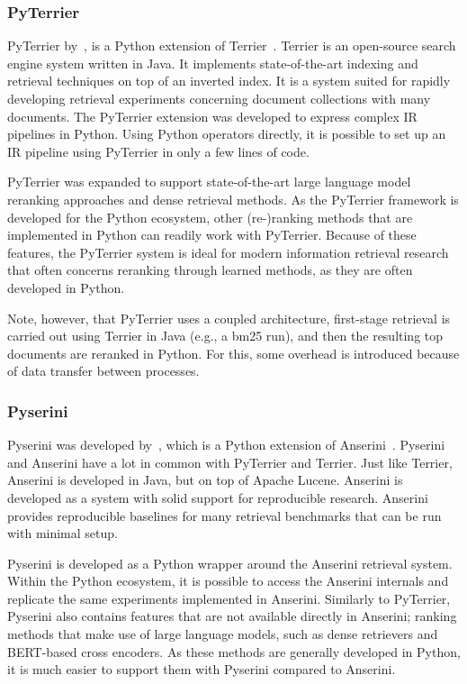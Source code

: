 \subsubsection{PyTerrier}
PyTerrier by~\citet{pyterrier}, is a Python extension of Terrier~\citep{terrier}. Terrier is an open-source search engine system written in Java. It implements state-of-the-art indexing and retrieval techniques on top of an inverted index. It is a system suited for rapidly developing retrieval experiments concerning document collections with many documents. 
The PyTerrier extension was developed to express complex IR pipelines in Python. Using Python operators directly, it is possible to set up an IR pipeline using PyTerrier in only a few lines of code. 

PyTerrier was expanded to support state-of-the-art large language model reranking approaches and dense retrieval methods. As the PyTerrier framework is developed for the Python ecosystem, other (re-)ranking methods that are implemented in Python can readily work with PyTerrier. Because of these features, the PyTerrier system is ideal for modern information retrieval research that often concerns reranking through learned methods, as they are often developed in Python.

Note, however, that PyTerrier uses a coupled architecture, first-stage retrieval is carried out using Terrier in Java (e.g., a bm25 run), and then the resulting top documents are reranked in Python. For this, some overhead is introduced because of data transfer between processes. 

\subsubsection{Pyserini}
Pyserini was developed by~\citet{pyserini}, which is a Python extension of Anserini~\citep{anserini}. Pyserini and Anserini have a lot in common with PyTerrier and Terrier. Just like Terrier, Anserini is developed in Java, but on top of Apache Lucene. Anserini is developed as a system with solid support for reproducible research. Anserini provides reproducible baselines for many retrieval benchmarks that can be run with minimal setup. 

Pyserini is developed as a Python wrapper around the Anserini retrieval system. Within the Python ecosystem, it is possible to access the Anserini internals and replicate the same experiments implemented in Anserini. Similarly to PyTerrier, Pyserini also contains features that are not available directly in Anserini; ranking methods that make use of large language models, such as dense retrievers and BERT-based cross encoders. As these methods are generally developed in Python, it is much easier to support them with Pyserini compared to Anserini.


